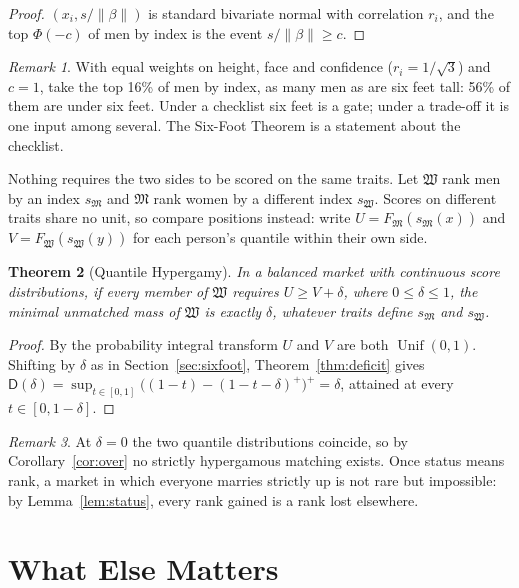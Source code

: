 \documentclass[11pt]{article}
\let\oldsection\section
\renewcommand{\section}{\Needspace{0.25\textheight}\oldsection}
\newtheorem{theorem}{Theorem}[section]
\theoremstyle{definition}
\theoremstyle{remark}
\newtheorem{remark}[theorem]{Remark}
\newcommand{\M}{\mathfrak{M}}
\newcommand{\W}{\mathfrak{W}}
\newcommand{\D}{\mathsf{D}}
\DeclareMathOperator{\Unif}{Unif}
\begin{document}
\begin{proof}
  $(x_i, s/\|\beta\|)$ is standard bivariate normal with correlation
  $r_i$, and the top $\Phi(-c)$ of men by index is the event
  $s/\|\beta\|\ge c$.
\end{proof}

\begin{remark}
  With equal weights on height, face and confidence ($r_i=1/\sqrt3$)
  and $c=1$, take the top 16\% of men by index, as many men as are six
  feet tall: 56\% of them are under six feet. Under a checklist six
  feet is a gate; under a trade-off it is one input among several. The
  Six-Foot Theorem is a statement about the checklist.
\end{remark}

Nothing requires the two sides to be scored on the same traits. Let $\W$
rank men by an index $s_\M$ and $\M$ rank women by a different index
$s_\W$. Scores on different traits share no unit, so compare positions
instead: write $U = F_\M(s_\M(x))$ and $V = F_\W(s_\W(y))$ for each
person's quantile within their own side.

\begin{theorem}[Quantile Hypergamy]\label{thm:quantile}
  In a balanced market with continuous score distributions, if every
  member of $\W$ requires $U\ge V+\delta$, where $0\le\delta\le1$, the
  minimal unmatched mass of $\W$ is exactly $\delta$, whatever traits
  define $s_\M$ and $s_\W$.
\end{theorem}

\begin{proof}
  By the probability integral transform $U$ and $V$ are both
  $\Unif(0,1)$. Shifting by $\delta$ as in Section~\ref{sec:sixfoot},
  Theorem~\ref{thm:deficit} gives $\D(\delta) = \sup_{t\in[0,1]}
  \bigl((1-t) - (1-t-\delta)^+\bigr)^+ = \delta$, attained at every
  $t\in[0,1-\delta]$.
\end{proof}

\begin{remark}
  At $\delta=0$ the two quantile distributions coincide, so by
  Corollary~\ref{cor:over} no strictly hypergamous matching exists. Once
  status means rank, a market in which everyone marries strictly up is
  not rare but impossible: by Lemma~\ref{lem:status}, every rank gained
  is a rank lost elsewhere.
\end{remark}

\section{What Else Matters}\label{sec:matters}
\end{document}
